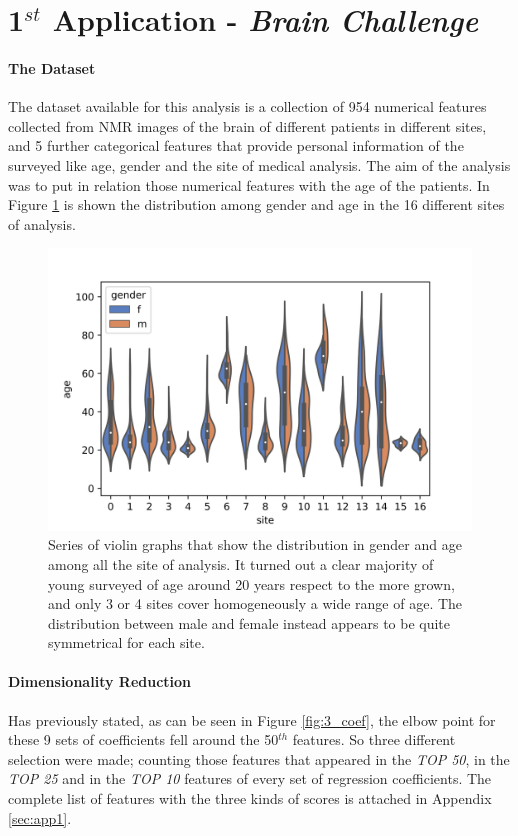 \documentclass{article}
\begin{document}
\section*{1$^{st}$ Application - \emph{Brain Challenge}}
\paragraph{The Dataset}
The dataset available for this analysis is a collection of 954 numerical features collected from NMR images of the brain of different patients in different sites, and 5 further categorical features that provide personal information of the surveyed like age, gender and the site of medical analysis. The aim of the analysis was to put in relation those numerical features with the age of the patients. In Figure \ref{fig:gend_distr} is shown the distribution among gender and age in the 16 different sites of analysis.

\begin{figure}[ht]
	\includegraphics[width=\textwidth]{violin_gender_site}
	\caption{Series of violin graphs that show the distribution in gender and age among all the site of analysis. It turned out a clear majority of young surveyed of age around 20 years respect to the more grown, and only 3 or 4 sites cover homogeneously a wide range of age. The distribution between male and female instead appears to be quite symmetrical for each site.  }
	\label{fig:gend_distr}
	\centering
\end{figure}

\paragraph{Dimensionality Reduction}
Has previously stated, as can be seen in Figure \ref{fig:3_coef}, the elbow point for these 9 sets of coefficients fell around the 50$^{th}$ features. So three different selection were made; counting those features that appeared in the \emph{TOP 50}, in the \emph{TOP 25} and in the \emph{TOP 10} features of every set of regression coefficients. The complete list of features with the three kinds of scores is attached in Appendix \ref{sec:app1}.
\end{document}
